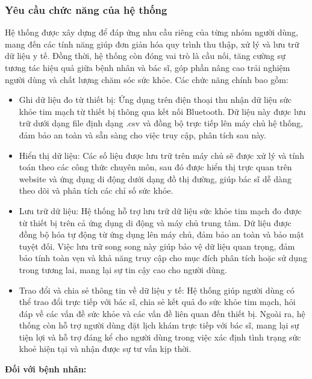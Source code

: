 \subsubsection{Yêu cầu chức năng của hệ thống}
Hệ thống được xây dựng để đáp ứng nhu cầu riêng của từng nhóm người dùng, mang đến các tính năng giúp đơn giản hóa quy trình thu thập, xử lý và lưu trữ dữ liệu y tế. Đồng thời, hệ thống còn đóng vai trò là cầu nối, tăng cường sự tương tác hiệu quả giữa bệnh nhân và bác sĩ, góp phần nâng cao trải nghiệm người dùng và chất lượng chăm sóc sức khỏe. Các chức năng chính bao gồm:
\begin{adjustwidth}{1.5em}{}
	\begin{itemize}
		\item Ghi dữ liệu đo từ thiết bị: Ứng dụng trên điện thoại thu nhận dữ liệu sức khỏe tim mạch từ thiết bị thông qua kết nối Bluetooth.
		      Dữ liệu này được lưu trữ dưới dạng file định dạng .csv và đồng bộ trực tiếp lên máy chủ hệ thống, đảm bảo an toàn và sẵn sàng cho việc truy cập, phân tích sau này.
		\item Hiển thị dữ liệu: Các số liệu được lưu trữ trên máy chủ sẽ được xử lý và tính toán theo các công thức chuyên môn, sau đó được hiển thị trực quan trên website và ứng dụng di động dưới dạng đồ thị đường, giúp bác sĩ dễ dàng theo dõi và phân tích các chỉ số sức khỏe.
		\item Lưu trữ dữ liệu: Hệ thống hỗ trợ lưu trữ dữ liệu sức khỏe tim mạch đo được từ thiết bị trên cả ứng dụng di động và máy chủ trung tâm. Dữ liệu được đồng bộ hóa tự động từ ứng dụng lên máy chủ, đảm bảo an toàn và bảo mật tuyệt đối. Việc lưu trữ song song này giúp bảo vệ dữ liệu quan trọng, đảm bảo tính toàn vẹn và khả năng truy cập cho mục đích phân tích hoặc sử dụng trong tương lai, mang lại sự tin cậy cao cho người dùng.
		\item Trao đổi và chia sẻ thông tin về dữ liệu y tế: Hệ thống giúp người dùng có thể trao đổi trực tiếp với bác sĩ, chia sẻ kết quả đo sức khỏe tim mạch, hỏi đáp về các vấn đề sức khỏe và các vấn đề liên quan đến thiết bị. Ngoài ra, hệ thống còn hỗ trợ người dùng đặt lịch khám trực tiếp với bác sĩ, mang lại sự tiện lợi và hỗ trợ đáng kể cho người dùng trong việc xác định tình trạng sức khoẻ hiện tại và nhận được sự tư vấn kịp thời.
	\end{itemize}
\end{adjustwidth}
\textbf{Đối với bệnh nhân:}
